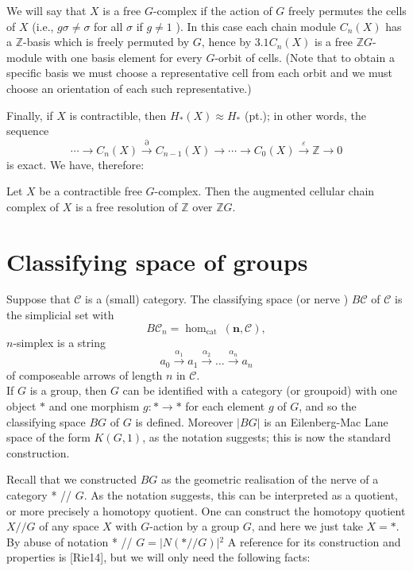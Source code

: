We will say that $X$ is a free $G$-complex if the action of $G$ freely permutes the cells of $X$ (i.e., $g \sigma \neq \sigma$ for all $\sigma$ if $g \neq 1$ ). In this case each chain module $C_n(X)$ has a $\mathbb{Z}$-basis which is freely permuted by $G$, hence by $3.1 C_n(X)$ is a free $\mathbb{Z} G$-module with one basis element for every $G$-orbit of cells. (Note that to obtain a specific basis we must choose a representative cell from each orbit and we must choose an orientation of each such representative.)

Finally, if $X$ is contractible, then $H_*(X) \approx H_*$ (pt.); in other words, the sequence
$$
\cdots \rightarrow C_n(X) \stackrel{\partial}{\rightarrow} C_{n-1}(X) \rightarrow \cdots \rightarrow C_0(X) \stackrel{\varepsilon}{\rightarrow} \mathbb{Z} \rightarrow 0
$$
is exact. We have, therefore:

\begin{prop}
    
    Let $X$ be a contractible free $G$-complex. Then the augmented cellular chain complex of $X$ is a free resolution of $\mathbb{Z}$ over $\mathbb{Z} G$.
\end{prop}




\section{Classifying space of groups}

Suppose that $\mathcal{C}$ is a (small) category. The classifying space (or nerve ) $B \mathcal{C}$ of $\mathcal{C}$ is the simplicial set with
$$
B \mathcal{C}_n=\operatorname{hom}_{\text {cat }}(\mathbf{n}, \mathcal{C}),
$$
$n$-simplex is a string
$$
a_0 \xrightarrow{\alpha_1} a_1 \xrightarrow{\alpha_2} \ldots \xrightarrow{\alpha_n} a_n
$$
of composeable arrows of length $n$ in $\mathcal{C}$.\\

If $G$ is a group, then $G$ can be identified with a category (or groupoid) with one object $*$ and one morphism $g: * \rightarrow *$ for each element $g$ of $G$, and so the classifying space $B G$ of $G$ is defined. Moreover $|B G|$ is an Eilenberg-Mac Lane space of the form $K(G, 1)$, as the notation suggests; this is now the standard construction.


Recall that we constructed $B G$ as the geometric realisation of the nerve of a category * // $G$. As the notation suggests, this can be interpreted as a quotient, or more precisely a homotopy quotient. One can construct the homotopy quotient $X / / G$ of any space $X$ with $G$-action by a group $G$, and here we just take $X=*$. By abuse of notation * // $G=|N(* / / G)|{ }^2$ A reference for its construction and properties is [Rie14], but we will only need the following facts:


